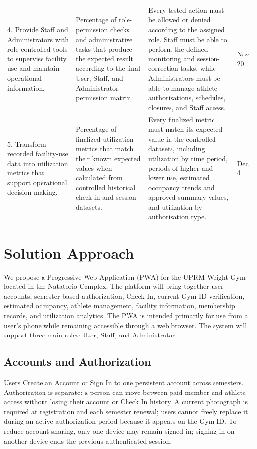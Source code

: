 \documentclass[11pt,letterpaper]{article}
\begin{document}
\begin{center}
\begin{longtable}{L{3.1cm} L{4.2cm} L{4.2cm} L{1.8cm}}
4. Provide Staff and Administrators with role-controlled tools to supervise facility use and maintain operational information.
&
Percentage of role-permission checks and administrative tasks that produce the expected result according to the final User, Staff, and Administrator permission matrix.
&
Every tested action must be allowed or denied according to the assigned role. Staff must be able to perform the defined monitoring and session-correction tasks, while Administrators must be able to manage athlete authorizations, schedules, closures, and Staff access.
&
Nov 20 \\
\addlinespace
\midrule
\addlinespace

5. Transform recorded facility-use data into utilization metrics that support operational decision-making.
&
Percentage of finalized utilization metrics that match their known expected values when calculated from controlled historical check-in and session datasets.
&
Every finalized metric must match its expected value in the controlled datasets, including utilization by time period, periods of higher and lower use, estimated occupancy trends and approved summary values, and utilization by authorization type.
&
Dec 4 \\
\end{longtable}
\end{center}

\section{Solution Approach}

We propose a Progressive Web Application (PWA) for the UPRM Weight Gym located in the Natatorio Complex. The platform will bring together user accounts, semester-based authorization, Check In, current Gym ID verification, estimated occupancy, athlete management, facility information, membership records, and utilization analytics. The PWA is intended primarily for use from a user's phone while remaining accessible through a web browser. The system will support three main roles: User, Staff, and Administrator.

\subsection{Accounts and Authorization}

Users Create an Account or Sign In to one persistent account across semesters. Authorization is separate: a person can move between paid-member and athlete access without losing their account or Check In history. A current photograph is required at registration and each semester renewal; users cannot freely replace it during an active authorization period because it appears on the Gym ID. To reduce account sharing, only one device may remain signed in; signing in on another device ends the previous authenticated session.
\end{document}
